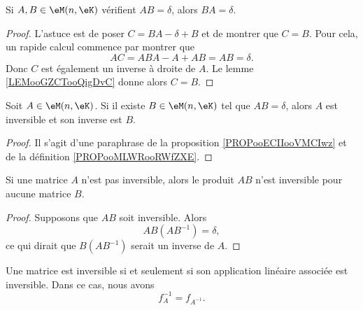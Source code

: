 \begin{proposition}      \label{PROPooECIIooVMCIwz}
    Si \( A,B\in \eM(n,\eK)\) vérifient \( AB=\delta\), alors \( BA=\delta\).
\end{proposition}

\begin{proof}
    L'astuce est de poser \( C=BA-\delta+B\) et de montrer que \( C=B\). Pour cela, un rapide calcul commence par montrer que
    \begin{equation}
        AC=ABA-A+AB=AB=\delta.
    \end{equation}
    Donc \( C\) est également un inverse à droite de \( A\). Le lemme \ref{LEMooGZCTooQigDvC} donne alors \( C=B\).
\end{proof}

\begin{corollary}       \label{CORooBQLXooTeVfgb}
    Soit \( A\in \eM(n,\eK)\). Si il existe \( B\in \eM(n,\eK)\) tel que \( AB=\delta\), alors \( A\) est inversible et son inverse est \( B\).
\end{corollary}

\begin{proof}
    Il s'agit d'une paraphrase de la proposition \ref{PROPooECIIooVMCIwz} et de la définition \ref{PROPooMLWRooRWfZXE}.
\end{proof}

\begin{lemma}       \label{LEMooZDNVooArIXzC}
    Si une matrice \( A\) n'est pas inversible, alors le produit \( AB\) n'est inversible pour aucune matrice \( B\).
\end{lemma}

\begin{proof}
    Supposons que \( AB\) soit inversible. Alors
    \begin{equation}
        AB(AB^{-1})=\delta,
    \end{equation}
    ce qui dirait que \( B(AB^{-1})\) serait un inverse de \( A\).
\end{proof}

\begin{proposition}     \label{PROPooNPMCooPmaCwu}
    Une matrice est inversible si et seulement si son application linéaire associée est inversible. Dans ce cas, nous avons
    \begin{equation}
        f_A^{-1}=f_{A^{-1}}.
    \end{equation}
\end{proposition}

